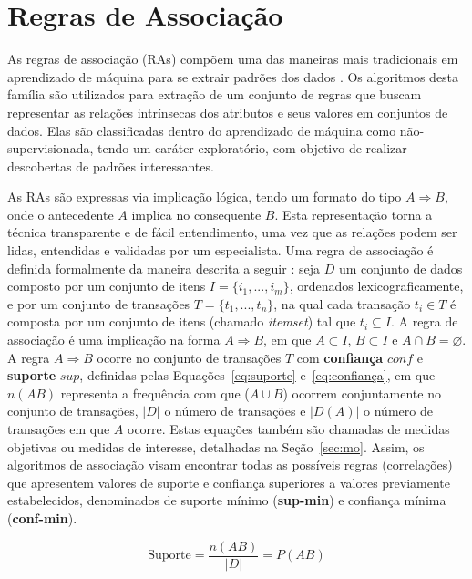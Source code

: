 \section{Regras de Associação}\label{sec:ra}

As regras de associação (RAs) compõem uma das maneiras mais tradicionais em aprendizado de máquina para se extrair padrões dos dados \cite{DBLP:conf/dawak/SharmaKPYD20}. Os algoritmos desta família são utilizados para extração de um conjunto de regras que buscam representar as relações intrínsecas dos atributos e seus valores em conjuntos de dados. Elas são classificadas dentro do aprendizado de máquina como não-supervisionada, tendo um caráter exploratório, com objetivo de realizar descobertas de padrões interessantes.

As RAs são expressas via implicação lógica, tendo um formato do tipo $A \Rightarrow B$, onde o antecedente $A$ implica no consequente $B$. Esta representação torna a técnica transparente e de fácil entendimento, uma vez que as relações podem ser lidas, entendidas e validadas por um especialista. Uma regra de associação é definida formalmente da maneira descrita a seguir \cite{apriori}: seja $D$ um conjunto de dados composto por um conjunto de itens $I = \{i_{1},...,i_{m}\}$, ordenados lexicograficamente, e por um conjunto de transações $T=\{t_1,...,t_n\}$, na qual cada transação $t_i \in T$ é composta por um conjunto de itens (chamado \textit{itemset}) tal que $t_i \subseteq I$. A regra de associação é uma implicação na forma $A \Rightarrow B$, em que $A \subset I$, $B \subset I$ e $A \cap B = \varnothing$. A regra $A \Rightarrow B$ ocorre no conjunto de transações $T$ com \textbf{confiança} $conf$ e \textbf{suporte} $sup$, definidas pelas Equações~\ref{eq:suporte} e~\ref{eq:confiança}, em que $n(AB)$ representa a frequência com que ($A \cup B$) ocorrem conjuntamente no conjunto de transações, $|D|$ o número de transações e $|D(A)|$ o número de transações em que $A$ ocorre. Estas equações também são chamadas de medidas objetivas ou medidas de interesse, detalhadas na Seção~\ref{sec:mo}. Assim, os algoritmos de associação visam encontrar todas as possíveis regras (correlações) que apresentem valores de suporte e confiança superiores a valores previamente estabelecidos, denominados de suporte mínimo (\textbf{sup-min}) e confiança mínima (\textbf{conf-min}).

\begin{equation}
\text{Suporte} = \dfrac{n(AB)}{|D|} = P(AB)
\label{eq:suporte}
\end{equation}

